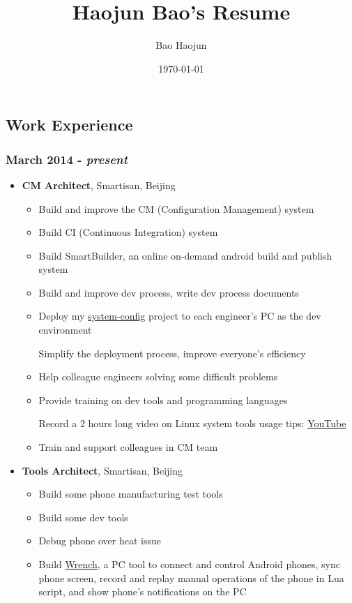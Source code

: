\documentclass[11pt,dvipdfmx,CJKbookmarks]{article}
\author{Bao Haojun}
\date{\today}
\title{Haojun Bao's Resume}
\begin{document}
\begin{CJK*}{UTF8}{simsun}

\maketitle
{}

\section{Work Experience}
\label{sec-1}
\subsubsection{March 2014 - \emph{present}}
\label{sec-1-0-1}
\begin{itemize}
\item \textbf{CM Architect}, Smartisan, Beijing
\begin{itemize}
\item Build and improve the CM (Configuration Management) system
\item Build CI (Continuous Integration) system
\item Build SmartBuilder, an online on-demand android build and publish system
\item Build and improve dev process, write dev process documents
\item Deploy my \href{https://github.com/baohaojun/system-config}{system-config} project to each engineer's PC as the dev environment

Simplify the deployment process, improve everyone's efficiency

\item Help colleague engineers solving some difficult problems
\item Provide training on dev tools and programming languages

Record a 2 hours long video on Linux system tools usage tips: \href{https://www.youtube.com/watch?v\%3Dqp2b3-Guej0}{YouTube}

\item Train and support colleagues in CM team
\end{itemize}

\item \textbf{Tools Architect}, Smartisan, Beijing

\begin{itemize}
\item Build some phone manufacturing test tools
\item Build some dev tools
\item Debug phone over heat issue
\item Build \href{https://github.com/SmartisanTech/Wrench}{Wrench}, a PC tool to connect and control Android phones, sync phone screen, record and replay manual operations of the phone in Lua script, and show phone's notifications on the PC
\end{itemize}
\end{itemize}


\end{CJK*}
\end{document}
